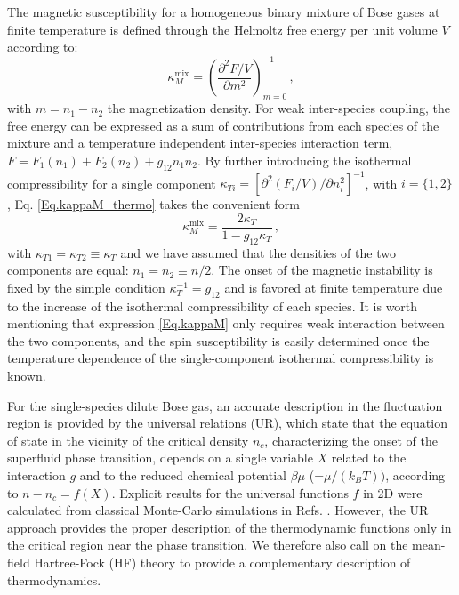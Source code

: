 \documentclass[pra,twocolumn,aps,showpacs,longbibliography]{revtex4-1}
\begin{document}
The magnetic susceptibility for a homogeneous binary mixture of Bose gases at finite temperature is defined through the Helmoltz free energy per unit volume $V$ according to:
\begin{equation}\label{Eq.kappaM_thermo}
\kappa_M^\mathrm{mix} = \left( \frac{\partial^2 F/V}{\partial m^2} \right)^{-1}_{m=0} \, ,
\end{equation}
with $m=n_1-n_2$ the magnetization density. For weak inter-species coupling, the free energy can be expressed as a sum of contributions from each species of the mixture and a temperature independent inter-species interaction term, $F=F_1(n_1)+F_2(n_2)+g_{12} n_1 n_2$.  By further introducing the isothermal compressibility for a single component $\kappa_{Ti}=\left[ \partial^2 (F_i/V) / \partial n_i^2 \right]^{-1}$, with $i=\{1, 2\}$, Eq. \eqref{Eq.kappaM_thermo} takes the convenient form
\begin{equation}\label{Eq.kappaM}
\kappa_M^\mathrm{mix}=  \frac{2\kappa_T}{1- g_{12}\kappa_T} \, ,
\end{equation}
with $\kappa_{T1}=\kappa_{T2} \equiv \kappa_T$ and we have assumed that the densities of the two components are equal: $n_1=n_2\equiv n/2$. The onset of the magnetic instability is fixed by the simple condition $\kappa_T^{-1} = g_{12}$ and is favored at finite temperature due to the increase of the isothermal compressibility of each species. It is worth mentioning that expression \eqref{Eq.kappaM} only requires weak interaction between the two components, and the spin susceptibility is easily determined once the temperature dependence of the single-component isothermal compressibility is known. 
\par
For the single-species dilute Bose gas, an accurate description in the fluctuation region is provided by the universal relations (UR), which state that the equation of state in the vicinity of the critical density $n_c$, characterizing the onset of the superfluid phase transition, depends on a single variable $X$ related to the interaction $g$ and to the reduced chemical potential $\beta \mu$ (=$\mu/(k_BT))$, according to $ n-n_c=f(X)$. Explicit results for the universal functions $f$ in 2D were calculated from classical Monte-Carlo simulations in Refs. \cite{Prokofev2002, Prokofev2004}. However, the UR approach provides the proper description of the thermodynamic functions only in the critical region near the phase transition. We therefore also call on the mean-field Hartree-Fock (HF) theory to provide a complementary description of thermodynamics. 
\par
\end{document}
